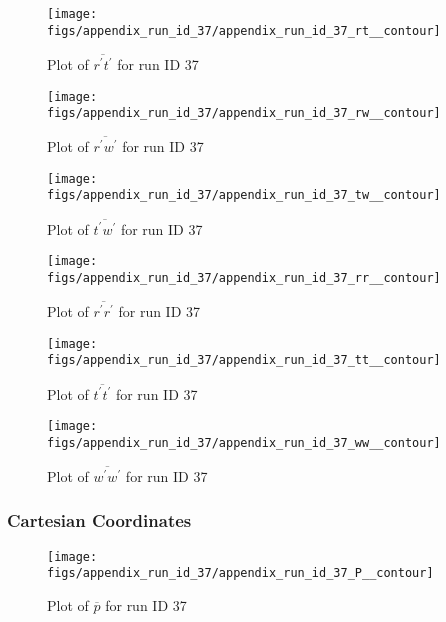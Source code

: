 \begin{figure}[H]
\centering
\texttt{[image: figs/appendix\_run\_id\_37/appendix\_run\_id\_37\_rt\_\_contour]}
\caption{Plot of $\overline{r^\prime t^\prime}$ for run ID 37}
\label{fig:appendix_run_id_37_rt__contour}
\end{figure}


\begin{figure}[H]
\centering
\texttt{[image: figs/appendix\_run\_id\_37/appendix\_run\_id\_37\_rw\_\_contour]}
\caption{Plot of $\overline{r^\prime w^\prime}$ for run ID 37}
\label{fig:appendix_run_id_37_rw__contour}
\end{figure}


\begin{figure}[H]
\centering
\texttt{[image: figs/appendix\_run\_id\_37/appendix\_run\_id\_37\_tw\_\_contour]}
\caption{Plot of $\overline{t^\prime w^\prime}$ for run ID 37}
\label{fig:appendix_run_id_37_tw__contour}
\end{figure}


\begin{figure}[H]
\centering
\texttt{[image: figs/appendix\_run\_id\_37/appendix\_run\_id\_37\_rr\_\_contour]}
\caption{Plot of $\overline{r^\prime r^\prime}$ for run ID 37}
\label{fig:appendix_run_id_37_rr__contour}
\end{figure}


\begin{figure}[H]
\centering
\texttt{[image: figs/appendix\_run\_id\_37/appendix\_run\_id\_37\_tt\_\_contour]}
\caption{Plot of $\overline{t^\prime t^\prime}$ for run ID 37}
\label{fig:appendix_run_id_37_tt__contour}
\end{figure}


\begin{figure}[H]
\centering
\texttt{[image: figs/appendix\_run\_id\_37/appendix\_run\_id\_37\_ww\_\_contour]}
\caption{Plot of $\overline{w^\prime w^\prime}$ for run ID 37}
\label{fig:appendix_run_id_37_ww__contour}
\end{figure}


\subsubsection{Cartesian Coordinates}
\begin{figure}[H]
\centering
\texttt{[image: figs/appendix\_run\_id\_37/appendix\_run\_id\_37\_P\_\_contour]}
\caption{Plot of $\overline{p}$ for run ID 37}
\label{fig:appendix_run_id_37_P__contour}
\end{figure}


